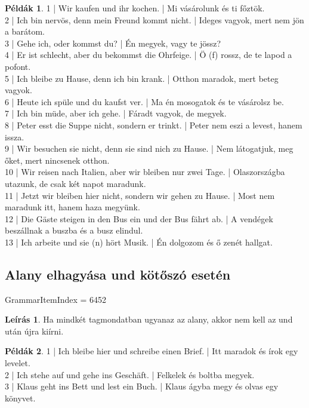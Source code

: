 \documentclass{article}
\theoremstyle{definition}
\newtheorem*{exmp}{Példák}
\newtheorem*{desc}{Leírás}
\begin{document}
\begin{exmp}
1 | Wir kaufen und ihr kochen. | Mi vásárolunk és ti főztök.\\
2 | Ich bin nervös, denn mein Freund kommt nicht. | Ideges vagyok, mert nem jön a barátom.\\
3 | Gehe ich, oder kommst du? | Én megyek, vagy te jössz?\\
4 | Er ist schlecht, aber du bekommst die Ohrfeige. | Ö (f) rossz, de te lapod a pofont.\\
5 | Ich bleibe zu Hause, denn ich bin krank. | Otthon maradok, mert beteg vagyok.\\
6 | Heute ich spüle und du kaufst ver. | Ma én mosogatok és te vásárolsz be.\\
7 | Ich bin müde, aber ich gehe. | Fáradt vagyok, de megyek.\\
8 | Peter esst die Suppe nicht, sondern er trinkt. | Peter nem eszi a levest, hanem issza.\\
9 | Wir besuchen sie nicht, denn sie sind nich zu Hause. | Nem látogatjuk, meg őket, mert nincsenek otthon.\\
10 | Wir reisen nach Italien, aber wir bleiben nur zwei Tage. | Olaszországba utazunk, de csak két napot maradunk.\\
11 | Jetzt wir bleiben hier nicht, sondern wir gehen zu Hause. | Most nem maradunk itt, hanem haza megyünk.\\
12 | Die Gäste steigen in den Bus ein und der Bus fährt ab. | A vendégek beszállnak a buszba és a busz elindul.\\
13 | Ich arbeite und sie (n) hört Musik. | Én dolgozom és ő zenét hallgat.\\
\end{exmp}

\subsection{Alany elhagyása und kötőszó esetén}

GrammarItemIndex = 6452

\begin{desc}
Ha mindkét tagmondatban ugyanaz az alany, akkor nem kell az und után újra kiírni.
\end{desc}

\begin{exmp}
1 | Ich bleibe hier und schreibe einen Brief. | Itt maradok és írok egy levelet.\\
2 | Ich stehe auf und gehe ins Geschäft. | Felkelek és boltba megyek.\\
3 | Klaus geht ins Bett und lest ein Buch. | Klaus ágyba megy és olvas egy könyvet.\\
\end{exmp}
\end{document}
